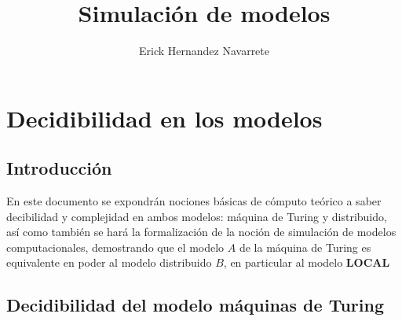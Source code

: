 \documentclass[10pt]{report}
\author{Erick Hernandez Navarrete}
\title{Simulación de modelos}
\begin{document}
    \maketitle
    \tableofcontents{}
    \chapter{Decidibilidad en los modelos}\label{ch:decidibilidad-en-los-modelos}
    \section{Introducción}\label{sec:introducción}
    En este documento se expondrán nociones básicas de cómputo teórico a saber decibilidad y complejidad en ambos modelos:
    máquina de Turing y distribuido,
    así como también se hará la formalización de la noción de simulación de modelos
    computacionales, demostrando que el modelo $A$ de  la máquina de
    Turing es equivalente en poder al modelo distribuido $B$, en particular al modelo \textbf{LOCAL}

    \section{Decidibilidad del modelo máquinas de Turing}\label{sec:decidibilidasd-en-el-modelo-de-máquinas-de-Turing}
\end{document}
